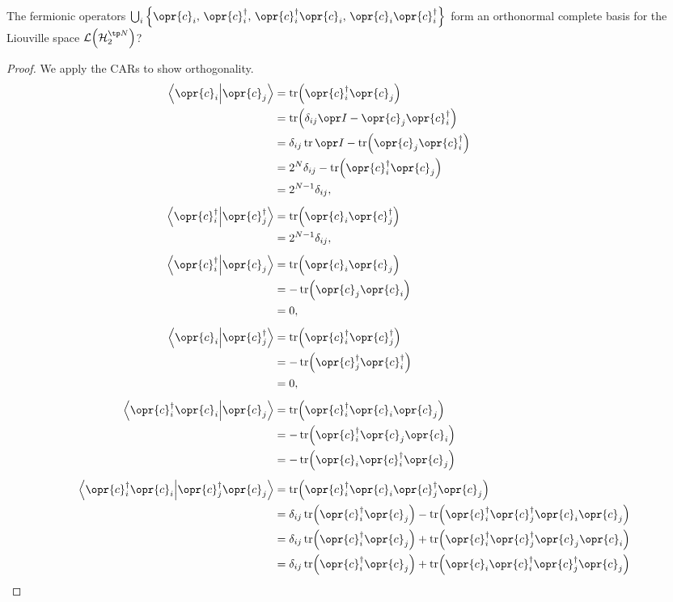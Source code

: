 \documentclass[../thesis.tex]{subfiles}
\begin{document}
\begin{thm}
  The fermionic operators $\bigcup_i \qty{\opr{c}_i,\, \opr{c}_i^\dag,\,
  \opr{c}_i^\dag\opr{c}_i,\, \opr{c}_i\opr{c}_i^\dag}$ form an orthonormal
  complete basis for the Liouville space $\liou\qty(\hilb_2^{\tp N})$?
  \begin{proof} We apply the CARs to show orthogonality.
    \begin{align}
      \ip{\opr{c}_i}{\opr{c}_j}
      &= \tr(\opr{c}_i^\dag\opr{c}_j) \\
      &= \tr(\delta_{ij}\idopr - \opr{c}_j\opr{c}_i^\dag) \\
      &= \delta_{ij}\tr\idopr - \tr(\opr{c}_j\opr{c}_i^\dag) \\
      &= 2^N\delta_{ij} - \tr(\opr{c}_i^\dag\opr{c}_j) \\
      &= 2^{N-1}\delta_{ij},
      \\[1ex]
      \ip{\opr{c}_i^\dag}{\opr{c}_j^\dag}
      &= \tr(\opr{c}_i\opr{c}_j^\dag) \\
      &= 2^{N-1}\delta_{ij},
      \\[1ex]
      \ip{\opr{c}_i^\dag}{\opr{c}_j}
      &= \tr(\opr{c}_i\opr{c}_j) \\
      &= -\tr(\opr{c}_j\opr{c}_i) \\
      &= 0,
      \\[1ex]
      \ip{\opr{c}_i}{\opr{c}_j^\dag}
      &= \tr(\opr{c}_i^\dag\opr{c}_j^\dag) \\
      &= -\tr(\opr{c}_j^\dag\opr{c}_i^\dag) \\
      &= 0,
      \\[1ex]
      \ip{\opr{c}_i^\dag \opr{c}_i}{\opr{c}_j}
      &= \tr(\opr{c}_i^\dag \opr{c}_i \opr{c}_j) \\
      &= -\tr(\opr{c}_i^\dag \opr{c}_j \opr{c}_i) \\
      &= -\tr(\opr{c}_i \opr{c}_i^\dag \opr{c}_j)
      \\[1ex]
      \ip{\opr{c}_i^\dag \opr{c}_i}{\opr{c}_j^\dag \opr{c}_j}
      &= \tr(\opr{c}_i^\dag \opr{c}_i \opr{c}_j^\dag \opr{c}_j) \\
      &= \delta_{ij}\tr(\opr{c}_i^\dag \opr{c}_j)
      - \tr(\opr{c}_i^\dag \opr{c}_j^\dag \opr{c}_i \opr{c}_j) \\
      &= \delta_{ij}\tr(\opr{c}_i^\dag \opr{c}_j)
      + \tr(\opr{c}_i^\dag \opr{c}_j^\dag \opr{c}_j \opr{c}_i) \\
      &= \delta_{ij}\tr(\opr{c}_i^\dag \opr{c}_j)
      + \tr(\opr{c}_i \opr{c}_i^\dag \opr{c}_j^\dag \opr{c}_j) \\

\end{align}
\end{proof}
\end{thm}
\end{document}
